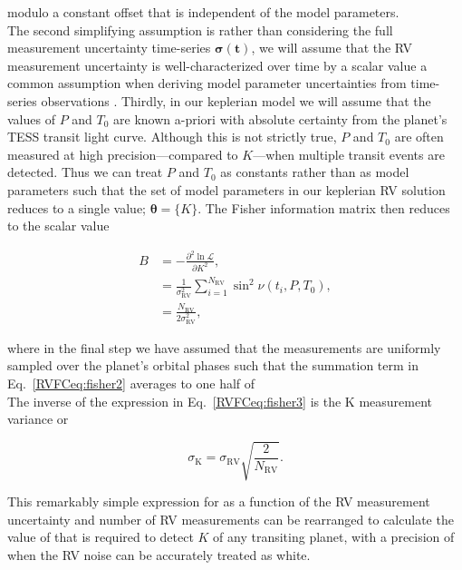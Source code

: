 \noindent modulo a constant offset that is independent of the model parameters. \\

The second simplifying assumption is rather
than considering the full measurement uncertainty time-series $\boldsymbol{\sigma}(\mathbf{t})$, we will
assume that the RV measurement uncertainty is well-characterized over time by a scalar value \sigRV{;} a common
assumption when deriving model parameter uncertainties from time-series observations \cite[e.g.][]{gaudi07, carter08}.
Thirdly, in our keplerian model 
we will assume that the values of $P$ and $T_0$ are known a-priori with absolute certainty
from the planet's TESS transit light curve. Although this is not strictly true, $P$ and $T_0$ are often
measured at high precision---compared to $K$---when multiple transit events are detected.
Thus we can treat $P$ and $T_0$ as constants rather than as model parameters such
that the set of model parameters in our keplerian RV solution reduces to a single value;
$\boldsymbol{\theta}=\{K\}$. The Fisher information matrix then reduces to the scalar value

\begin{align}
  B &= - \frac{\partial^2 \ln{\mathcal{L}}}{\partial K^2}, \\
  &= \frac{1}{\sigma_{\text{RV}}^2} \sum^{N_{\text{RV}}}_{i=1} \sin^2{\nu(t_i,P,T_0)},  \label{RVFCeq:fisher2} \\
  &= \frac{N_{\text{RV}}}{2\sigma^2_{\text{RV}}}, \label{RVFCeq:fisher3}
\end{align}  

\noindent where in the final step we have assumed 
that the \nrv{} measurements are uniformly sampled
over the planet's orbital phases such that the summation term in Eq.~\ref{RVFCeq:fisher2} averages to one
half of  \\

The inverse of the expression in Eq.~\ref{RVFCeq:fisher3} is the K measurement variance or

\begin{equation}
  \sigma_{\text{K}} = \sigma_{\text{RV}} \sqrt{\frac{2}{N_{\text{RV}}}}.
  \label{RVFCeq:sigK}
\end{equation}

\noindent This remarkably simple expression for \sigK{} as a function
of the RV measurement uncertainty and number of RV measurements 
can be rearranged to calculate the value of \nrv{} that is
required to detect $K$ of any transiting planet, with a precision of \sigK{,} when the RV noise
can be accurately treated as white.

